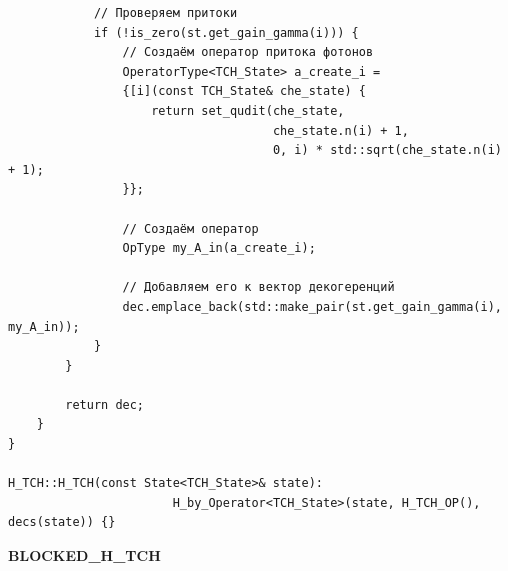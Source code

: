 \documentclass[12pt,fleqn]{article}
\begin{document}
\begin{mdframed}[linecolor=black, topline=true, bottomline=true,
leftline=false, rightline=false]
\begin{verbatim}
            // Проверяем притоки
            if (!is_zero(st.get_gain_gamma(i))) {
                // Создаём оператор притока фотонов
                OperatorType<TCH_State> a_create_i = 
                {[i](const TCH_State& che_state) {
                    return set_qudit(che_state,
                                     che_state.n(i) + 1,
                                     0, i) * std::sqrt(che_state.n(i) + 1);
                }};

                // Создаём оператор
                OpType my_A_in(a_create_i);

                // Добавляем его к вектор декогеренций
                dec.emplace_back(std::make_pair(st.get_gain_gamma(i), my_A_in));
            }
        }

        return dec;
    }
}

H_TCH::H_TCH(const State<TCH_State>& state):
                       H_by_Operator<TCH_State>(state, H_TCH_OP(), decs(state)) {}
\end{verbatim}
\end{mdframed}

        \begin{center}
        \textbf{BLOCKED\_H\_TCH}
        \end{center}
        
\end{document}
